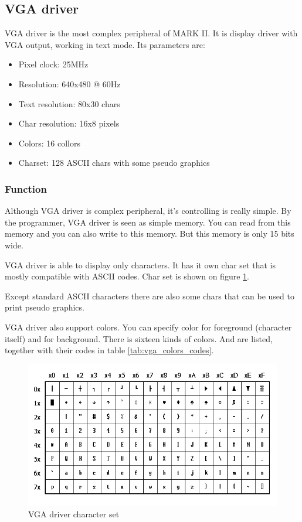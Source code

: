 \subsection{VGA driver}

VGA driver is the most complex peripheral of MARK II. It is display driver with
VGA output, working in text mode. Its parameters are:

\begin{itemize}
    \item Pixel clock: 25MHz
    \item Resolution: 640x480 @ 60Hz
    \item Text resolution: 80x30 chars
    \item Char resolution: 16x8 pixels
    \item Colors: 16 collors
    \item Charset: 128 ASCII chars with some pseudo graphics
\end{itemize}

\subsubsection{Function}

Although VGA driver is complex peripheral, it's controlling is really simple.
By the programmer, VGA driver is seen as simple memory. You can read from this
memory and you can also write to this memory. But this memory is only 15 bits
wide.

VGA driver is able to display only characters. It has it own char set that is
mostly compatible with ASCII codes. Char set is shown on figure
\ref{fig:MARK_II_charset}.

Except standard ASCII characters there are also some chars that can be used to
print pseudo graphics.

VGA driver also support colors. You can specify color for foreground (character
itself) and for background. There is sixteen kinds of colors. And are listed,
together with their codes in table \ref{tab:vga_colors_codes}.

\begin{figure}[h]
    \centering
    \includegraphics[width=.85\textwidth]{img/MARKII_charset.png}
    \caption{VGA driver character set}
    \label{fig:MARK_II_charset}
\end{figure}

